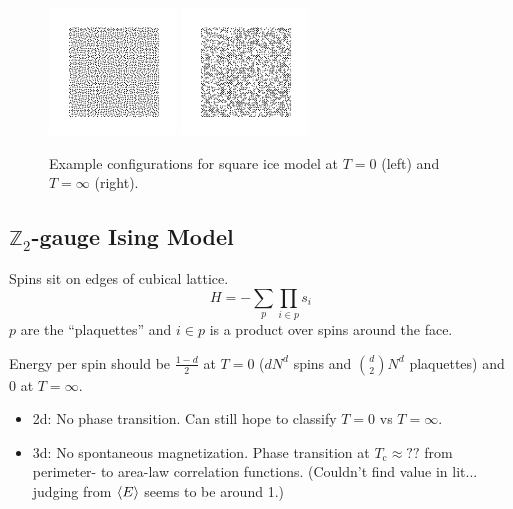 \documentclass[11pt]{article}
\begin{document}
\begin{figure}[h]
    \centering
    \includegraphics[width=0.3\textwidth]{squareice_T=0.png}
    \includegraphics[width=0.3\textwidth]{squareice_T=inf.png}
    \caption{Example configurations for square ice model at $T=0$ (left) and $T=\infty$ (right).}
\end{figure}


\subsection{$\mathbb{Z}_2$-gauge Ising Model}
Spins sit on edges of cubical lattice.
\begin{equation}
    H = -\sum_p\prod_{i\in p}s_i
\end{equation}
$p$ are the ``plaquettes'' and $i\in p$ is a product over spins around the face.

Energy per spin should be $\frac{1-d}{2}$ at $T=0$ ($dN^d$ spins and $\binom{d}{2}N^d$ plaquettes) and 0 at $T=\infty$.

\begin{itemize}
    \item 2d: No phase transition. Can still hope to classify $T=0$ vs $T=\infty$.
    \item 3d: No spontaneous magnetization. Phase transition at $T_\text{c}\approx??$ from perimeter- to area-law correlation functions. (Couldn't find value in lit... judging from $\ev{E}$ seems to be around 1.)
\end{itemize}
\end{document}
